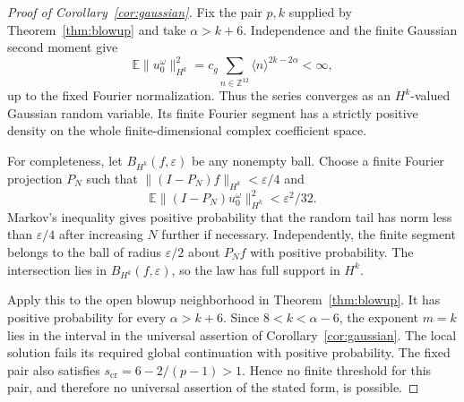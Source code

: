\begin{proof}[Proof of Corollary~\ref{cor:gaussian}]
Fix the pair $p,k$ supplied by Theorem~\ref{thm:blowup} and take
$\alpha>k+6$. Independence and the finite Gaussian second moment give
\[
 \mathbb E\|u_0^\omega\|_{H^k}^2
 =c_g\sum_{n\in\mathbb Z^{12}}\langle n\rangle^{2k-2\alpha}<\infty,
\]
up to the fixed Fourier normalization. Thus the series converges as an
$H^k$-valued Gaussian random variable. Its finite Fourier segment has a
strictly positive density on the whole finite-dimensional complex
coefficient space.

For completeness, let $B_{H^k}(f,\varepsilon)$ be any nonempty ball.
Choose a finite Fourier projection $P_N$ such that
$\|(I-P_N)f\|_{H^k}<\varepsilon/4$ and
\[
 \mathbb E\|(I-P_N)u_0^\omega\|_{H^k}^2<\varepsilon^2/32.
\]
Markov's inequality gives positive probability that the random tail
has norm less than $\varepsilon/4$ after increasing $N$ further if
necessary. Independently, the finite segment belongs to the ball of
radius $\varepsilon/2$ about $P_Nf$ with positive probability.
The intersection lies in $B_{H^k}(f,\varepsilon)$, so the law has full
support in $H^k$.

Apply this to the open blowup neighborhood in Theorem~\ref{thm:blowup}.
It has positive probability for every $\alpha>k+6$. Since
$8<k<\alpha-6$, the exponent $m=k$ lies in the interval in the universal assertion of
Corollary~\ref{cor:gaussian}. The local solution fails its required global continuation
with positive probability. The fixed pair also satisfies
$s_{\mathrm{cr}}=6-2/(p-1)>1$. Hence no finite threshold for this pair,
and therefore no universal assertion of the stated form, is possible.
\end{proof}
